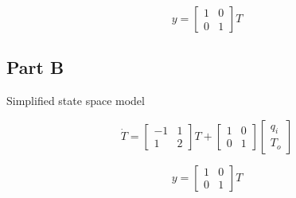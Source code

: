 \documentclass[12pt]{article}
\numberwithin{equation}{subsection}
\begin{document}
  \begin{equation}
    y =
    \begin{bmatrix}
      1 & 0 \\
      0 & 1
    \end{bmatrix}T
  \end{equation}

  \subsection{Part B}

  Simplified state space model

  \begin{equation}
    \dot T =
    \begin{bmatrix}
      -1 & 1 \\
      1 & 2
    \end{bmatrix} T +
    \begin{bmatrix}
      1 & 0\\0 & 1
    \end{bmatrix}
    \begin{bmatrix}
      q_i \\ T_o
    \end{bmatrix}
  \end{equation}

  \begin{equation}
    y =
    \begin{bmatrix}
      1 & 0 \\
      0 & 1
    \end{bmatrix}T
  \end{equation}
\end{document}
